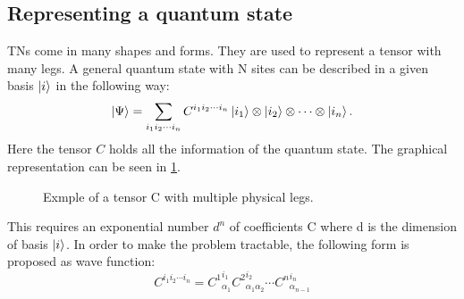 \subsection{Representing a quantum state}

\Glspl{TN} come in many shapes and forms. They are used to represent a tensor with many legs. A general quantum state with N sites can be described in a given basis $\ket{i}$ in the following way:
\begin{equation}
    \ket{\Psi} = \sum_{i_1 i_2 \cdots i_n } C^{i_1 i_2 \cdots i_n} \ket{i_1} \otimes \ket{i_2} \otimes \cdots \otimes \ket{i_n} .
\end{equation}
Here the tensor $C$ holds all the information of the quantum state. The graphical representation can be seen in \cref{fig:tens:intro:C}.
\begin{figure}[h!]
    \centering


    \caption{Exmple of a tensor C with multiple physical legs.}
    \label{fig:tens:intro:C}
\end{figure}
\noindent
This requires an exponential number $d^n$ of coefficients C where d is the dimension of basis $\ket{i}$. In order to make the problem tractable, the following form is proposed as wave function:
\begin{equation}
    C^{i_1 i_2 \cdots i_n} = {C^{1}}_{\alpha_1}^{ i_1} {C^{2}}_{\alpha_1 \alpha_2}^{i_2} \cdots  {C^{n}}_{\alpha_{n-1} }^{i_n}
\end{equation}

